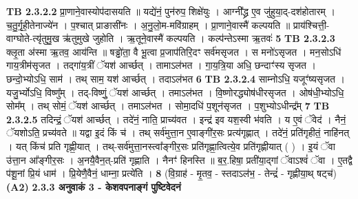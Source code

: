 \documentclass[17pt]{extarticle}
\begin{document}
                  \newline
                                \textbf{ TB 2.3.2.2} \newline
                  प्रा॒णाने॒वास्योप॑दासयति ॥ यद्ये॑नं॒ पुन॑रुप॒ शिक्षे॑युः । आग्नी᳚द्ध्र ए॒व जु॑हुया॒द्-दश॑होतारम् । च॒तु॒र्गृ॒ही॒तेनाज्ये॑न । प॒श्चात् प्राङासी॑नः । अ॒नु॒लो॒म-मवि॑ग्राहम् । प्रा॒णाने॒वास्मै॑ कल्पयति ॥ प्राय॑श्चित्ती॒-वाग्घोते-त्यृ॑तुमु॒ख ऋ॑तुमुखे जुहोति । ऋ॒तूने॒वास्मै॑ कल्पयति । कल्प॑न्तेऽस्मा ऋ॒तवः॑ \textbf{ 5} \newline
                  \newline
                                \textbf{ TB 2.3.2.3} \newline
                  क्लृ॒ता अ॑स्मा ऋ॒तव॒ आय॑न्ति ॥ षड्ढो॑ता॒ वै भू॒त्वा प्र॒जाप॑तिरि॒दꣳ सर्व॑मसृजत । स मनो॑ऽसृजत । मन॒सोऽधि॑ गाय॒त्रीम॑सृजत । तद्गा॑य॒त्रीं ॅयश॑ आर्च्छत् । तामाऽल॑भत । गा॒य॒त्रि॒या अधि॒ छन्दाꣳ॑स्य सृजत । छन्दो॒भ्योऽधि॒ साम॑ । तथ् साम॒ यश॑ आर्च्छत् । तदाऽल॑भत \textbf{ 6} \newline
                  \newline
                                \textbf{ TB 2.3.2.4} \newline
                  साम्नोऽधि॒ यजूꣳ॑ष्यसृजत । यजु॒र्भ्योऽधि॒ विष्णु᳚म् । तद्-विष्णुं॒ ॅयश॑ आर्च्छत् । तमाऽल॑भत । वि॒ष्णोरद्ध्योष॑धीरसृजत । ओष॑धी॒भ्योऽधि॒ सोम᳚म् । तथ् सोमं॒ ॅयश॑ आर्च्छत् । तमाऽल॑भत । सोमा॒दधि॑ प॒शून॑सृजत । प॒शुभ्योऽधीन्द्र᳚म् \textbf{ 7} \newline
                  \newline
                                \textbf{ TB 2.3.2.5} \newline
                  तदिन्द्रं॒ ॅयश॑ आर्च्छत् । तदे॑नं॒ नाति॒ प्राच्य॑वत । इन्द्र॑ इव यश॒स्वी भ॑वति । य ए॒वं ॅवेद॑ । नैनं॒ ॅयशोऽति॒ प्रच्य॑वते ॥ यद्वा इ॒दं किं च॑ । तथ् सर्व॑मुत्ता॒न ए॒वाङ्गी॑र॒सः प्रत्य॑गृह्णात् । तदे॑नं॒ प्रति॑गृहीतं॒ नाहि॑नत् । यत् किंच॑ प्रति गृह्णी॒यात् । तथ्-सर्व॑मुत्ता॒नस्त्वा᳚ङ्गीर॒सः प्रति॑गृह्णा॒त्वित्ये॒व प्रति॑गृह्णीयात् ( ) । इ॒यं ॅवा उ॑त्ता॒न आ᳚ङ्गीर॒सः । अ॒नयै॒वैन॒त्-प्रति॑ गृह्णाति । नैनꣳ॑ हिनस्ति ॥ ब॒र॒.हिषा॒ प्रती॑या॒द्गां ॅवाऽश्वं॑ ॅवा । ए॒तद्वै प॑शू॒नां प्रि॒यं धाम॑ । प्रि॒येणै॒वैनं॒ धाम्ना॒ प्रत्ये॑ति । \textbf{ 8} \newline
                  \newline
                                    (वि॒ग्राह॑ - मृ॒तव॒ - स्तदाऽल॑भ॒ - तेन्द्रं॑ - गृह्णीया॒थ् षट्च॑) \textbf{(A2)} \newline \newline
                \textbf{ 2.3.3      अनुवाकं   3 - केशवपनाङ्गं पुष्टिवेदनं} \newline
\end{document}
